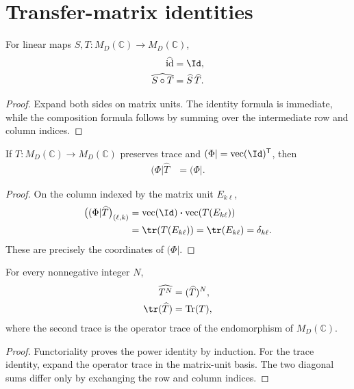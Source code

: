 \section{Transfer-matrix identities}

\begin{theorem}
    \label{thm:transfer_matrix_functoriality}
    \leanok
    For linear maps $S,T:M_D(\mathbb C)\to M_D(\mathbb C)$,
    \begin{align}
        \widehat{\operatorname{id}} & =\Id,                    \\
        \widehat{S\circ T}          & =\widehat S\,\widehat T.
    \end{align}
\end{theorem}

\begin{proof}\leanok
    Expand both sides on matrix units.  The identity formula is immediate,
    while the composition formula follows by summing over the intermediate
    row and column indices.
\end{proof}


\begin{theorem}
    \label{thm:transfer_matrix_trace_preserving_identity_left_fixed}
    \leanok
    If $T:M_D(\mathbb C)\to M_D(\mathbb C)$ preserves trace and
    $(\Phi\rvert=\operatorname{vec}(\Id)^{\mathsf T}$, then
    \begin{align}
        (\Phi\rvert\widehat T & =(\Phi\rvert.
    \end{align}
\end{theorem}

\begin{proof}\leanok

    On the column indexed by the matrix unit $E_{k\ell}$,
    \begin{align}
        \bigl((\Phi\rvert\widehat T\bigr)_{(\ell,k)}
         & =\operatorname{vec}(\Id)\mathbin{\boldsymbol\cdot}
        \operatorname{vec}(T(E_{k\ell}))                      \\
         & =\tr(T(E_{k\ell}))
        =\tr(E_{k\ell})
        =\delta_{k\ell}.
    \end{align}
    These are precisely the coordinates of $(\Phi\rvert$.
\end{proof}

\begin{theorem}
    \label{thm:transfer_matrix_power_trace}
    \leanok
    For every nonnegative integer $N$,
    \begin{align}
        \widehat{T^N}   & =(\widehat T)^N,       \\
        \tr(\widehat T) & =\operatorname{Tr}(T),
    \end{align}
    where the second trace is the operator trace of the endomorphism of
    $M_D(\mathbb C)$.
\end{theorem}

\begin{proof}\leanok
    Functoriality proves the power identity by induction.  For the trace
    identity, expand the operator trace in the matrix-unit basis.  The two
    diagonal sums differ only by exchanging the row and column indices.
\end{proof}
